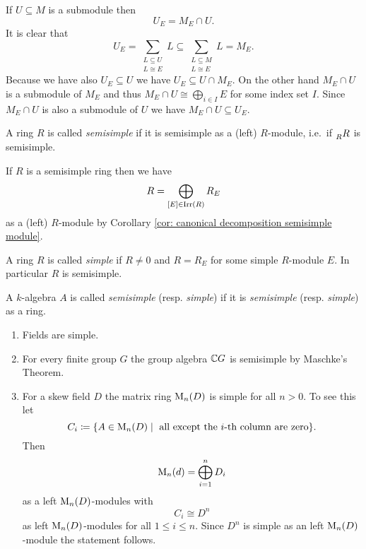 \begin{rem}
\begin{enumerate}[label=\emph{\alph*)},leftmargin=*]
      If $U \subseteq M$ is a submodule then
      \[
        U_E = M_E \cap U.
      \]
      It is clear that
      \[
        U_E = \sum_{\substack{L \subseteq U \\ L \cong E}} L \subseteq \sum_{\substack{L \subseteq M \\ L \cong E}} L = M_E.
      \]
      Because we have also $U_E \subseteq U$ we have $U_E \subseteq U \cap M_E$. On the other hand $M_E \cap U$ is a submodule of $M_E$ and thus $M_E \cap U \cong \bigoplus_{i \in I} E$ for some index set $I$. Since $M_E \cap U$ is also a submodule of $U$ we have $M_E \cap U \subseteq U_E$.
  \end{enumerate}
\end{rem}


\begin{defi}
  A ring $R$ is called \emph{semisimple} if it is semisimple as a (left) $R$-module, i.e.\ if $\prescript{}{R}{R}$ is semisimple.
\end{defi}


If $R$ is a semisimple ring then we have
\[
  R = \bigoplus_{[E] \in \operatorname{Irr}(R)} R_E
\]
as a (left) $R$-module by Corollary \ref{cor: canonical decomposition semisimple module}.


\begin{defi}
  A ring $R$ is called \emph{simple} if $R \neq 0$ and $R = R_E$ for some simple $R$-module $E$. In particular $R$ is semisimple.
\end{defi}


\begin{defi}
  A $k$-algebra $A$ is called \emph{semisimple} (resp. \emph{simple}) if it is \emph{semisimple} (resp. \emph{simple}) as a ring.
\end{defi}


\begin{expls}
  \begin{enumerate}[label=\emph{\alph*)},leftmargin=*]
    \item
      Fields are simple.
    \item
      For every finite group $G$ the group algebra $\mathbb{C} G$ is semisimple by Maschke’s Theorem.
    \item
      For a skew field $D$ the matrix ring $\operatorname{M}_n(D)$ is simple for all $n > 0$. To see this let
      \[
        C_i
        \coloneqq \{ A \in \operatorname{M}_n(D) \mid \text{ all except the $i$-th column are zero} \}.
      \]
      Then
      \[
        \operatorname{M}_n(d) = \bigoplus_{i=1}^n D_i
      \]
      as a left $\operatorname{M}_n(D)$-modules with
      \[
        C_i \cong D^n
      \]
      as left $\operatorname{M}_n(D)$-modules for all $1 \leq i \leq n$. Since $D^n$ is simple as an left $\operatorname{M}_n(D)$-module the statement follows.
  \end{enumerate}
\end{expls}


